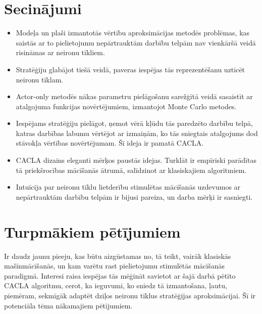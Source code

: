 \documentclass[a0,landscape]{a0poster}
\numberwithin{equation}{section}
\theoremstyle{definition}
\theoremstyle{plain}
\begin{document}
\begin{multicols}{5}
\color{SaddleBrown} %

\section*{Secinājumi}

\begin{itemize}
	\item Modeļa un plaši izmantotās vērtību aproksimācijas metodēs problēmas, kas saistās ar to pielietojumu nepārtrauktām darbību telpām nav vienkāršā veidā risināmas ar neironu tīkliem.
	\item Stratēģiju glabājot tiešā veidā, paveras iespējas tās reprezentēšanu uzticēt neironu tīklam.
	\item Actor-only metodēs nākas parametru pielāgošanu sarežģītā veidā sasaistīt ar atalgojuma funkcijas novērtējumiem, izmantojot Monte Carlo metodes.
	\item Iespējams stratēģiju pielāgot, ņemot vērā kļūdu tās paredzēto darbību telpā, katras darbības labumu vērtējot ar izmaiņām, ko tās sniegtais atalgojums dod stāvokļa vērtības novērtējumam. Šī ideja ir pamatā CACLA.
	\item CACLA dizains eleganti mērķos paustās idejas. Turklāt ir empīriski parādītas tā priekšrocības mācīšanās ātrumā, salīdzinot ar klasiskajiem algoritmiem.
	\item Intuīcija par neironu tīklu lietderību stimulētas mācīšanās uzdevumos ar nepārtrauktām darbību telpām ir bijusi pareiza, un darba mērķi ir sasniegti.
\end{itemize}

\color{DarkSlateGray} %


\section*{Turpmākiem pētījumiem}

Ir daudz jaunu pieeju, kas būtu aizgūstamas no, tā teikt, vairāk klasiskās mašīnmācīšanās, un kam varētu rast pielietojumu stimulētās mācīšanās paradigmā.
Interesi raisa iespējas tās mēģināt savietot ar šajā darbā pētīto CACLA algoritmu, cerot, ka ieguvumi, ko sniedz tā izmantošana, ļautu, piemēram, sekmīgāk adaptēt dziļos neironu tīklus stratēģijas aproksimācijai.
Šī ir potenciāla tēma nākamajiem pētījumiem.


\end{multicols}
\end{document}
